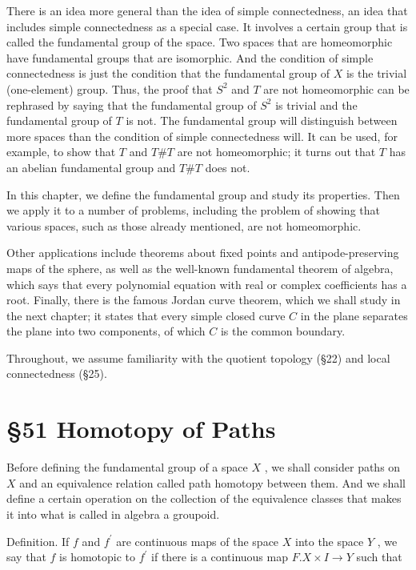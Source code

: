 \documentclass[10pt]{article}
\begin{document}
There is an idea more general than the idea of simple connectedness, an idea that includes simple connectedness as a special case. It involves a certain group that is called the fundamental group of the space. Two spaces that are homeomorphic have fundamental groups that are isomorphic. And the condition of simple connectedness is just the condition that the fundamental group of \(X\) is the trivial (one-element) group. Thus, the proof that \({S}^{2}\) and \(T\) are not homeomorphic can be rephrased by saying that the fundamental group of \({S}^{2}\) is trivial and the fundamental group of \(T\) is not. The fundamental group will distinguish between more spaces than the condition of simple connectedness will. It can be used, for example, to show that \(T\) and \(T\# T\) are not homeomorphic; it turns out that \(T\) has an abelian fundamental group and \(T\# T\) does not.

In this chapter, we define the fundamental group and study its properties. Then we apply it to a number of problems, including the problem of showing that various spaces, such as those already mentioned, are not homeomorphic.

Other applications include theorems about fixed points and antipode-preserving maps of the sphere, as well as the well-known fundamental theorem of algebra, which says that every polynomial equation with real or complex coefficients has a root. Finally, there is the famous Jordan curve theorem, which we shall study in the next chapter; it states that every simple closed curve \(C\) in the plane separates the plane into two components, of which \(C\) is the common boundary.

Throughout, we assume familiarity with the quotient topology (§22) and local connectedness (§25).

\section*{§51 Homotopy of Paths}

Before defining the fundamental group of a space \(X\) , we shall consider paths on \(X\) and an equivalence relation called path homotopy between them. And we shall define a certain operation on the collection of the equivalence classes that makes it into what is called in algebra a groupoid.

Definition. If \(f\) and \({f}^{\prime }\) are continuous maps of the space \(X\) into the space \(Y\) , we say that \(f\) is homotopic to \({f}^{\prime }\) if there is a continuous map \(F.X \times  I \rightarrow  Y\) such that
\end{document}
